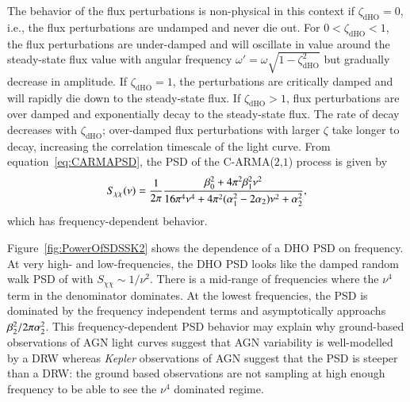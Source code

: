 \documentclass[a4paper,fleqn,usenatbib]{mnras}
\begin{document}
The behavior of the flux perturbations is non-physical in this context if $\zeta_{\mathrm{dHO}} = 0$, i.e., the flux perturbations are undamped and never die out. For $0 < \zeta_{\mathrm{dHO}} < 1$, the flux perturbations are under-damped and will oscillate in value around the steady-state flux value with angular frequency $\omega' = \omega\sqrt{1 - \zeta_{\mathrm{dHO}}^{2}}$ but gradually decrease in amplitude. If $\zeta_{\mathrm{dHO}} = 1$, the perturbations are critically damped and will rapidly die down to the steady-state flux. If $\zeta_{\mathrm{dHO}} > 1$, flux perturbations are over damped and exponentially decay to the steady-state flux. The rate of decay decreases with $\zeta_{\mathrm{dHO}}$; over-damped flux perturbations with larger $\zeta$ take longer to decay, increasing the correlation timescale of the light curve. From equation~\eqref{eq:CARMAPSD}, the PSD of the C-ARMA($2$,$1$) process is given by
\begin{equation}\label{eq:CARMA21PSD}
S_{\chi\chi}(\nu) = \frac{1}{2\pi}\frac{\beta_{0}^{2} + 4\pi^{2}\beta_{1}^{2}\nu^{2}}{16\pi^{4}\nu^{4} + 4\pi^{2}(\alpha_{1}^{2}-2\alpha_{2})\nu^{2} + \alpha_{2}^{2}},
\end{equation} 
which has frequency-dependent behavior. 

Figure~\ref{fig:PowerOfSDSSK2} shows the dependence of a DHO PSD on frequency. At very high- and low-frequencies, the DHO PSD looks like the damped random walk PSD of \citet{Kelly09} with $S_{\chi\chi} \sim 1/\nu^{2}$. There is a mid-range of frequencies where the $\nu^{4}$ term in the denominator dominates. At the lowest frequencies, the PSD is dominated by the frequency independent terms and asymptotically approachs $\beta_{2}^{2}/2\pi \alpha_{2}^{2}$. This frequency-dependent PSD behavior may explain why ground-based observations of AGN light curves suggest that AGN variability is well-modelled by a DRW whereas \textit{Kepler} observations of AGN suggest that the PSD is steeper than a DRW: the ground based observations are not sampling at high enough frequency to be able to see the $\nu^{4}$ dominated regime. 
\end{document}
